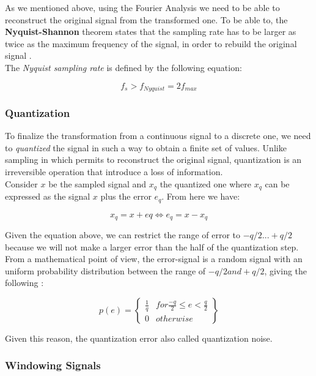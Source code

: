 \noindent As we mentioned above, using the Fourier Analysis we need to be able to reconstruct the original signal from the transformed one. To be able to, the \textbf{Nyquist-Shannon} theorem states that the sampling rate has to be larger as twice as the maximum frequency of the signal, in order to rebuild the original signal \cite{sampling_illinois}.\\
\noindent The \textit{Nyquist sampling rate} is defined by the following equation:

\begin{equation}
f_{s} > f_{Nyquist} = 2f_{max}
\end{equation}


\subsubsection{Quantization}
\label{subs:quantization}
To finalize the transformation from a continuous signal to a discrete one, we need to \textit{quantized} the signal in such a way to obtain a finite set of values. Unlike sampling in which permits to reconstruct the original signal, quantization is an irreversible operation that introduce a loss of information. \\
\noindent Consider $x$ be the sampled signal and $x_{q}$ the quantized one where $x_{q}$ can be expressed as the signal $x$ plus the error $e_{q}$. From here we have:

\begin{equation}
x_{q} = x + e{q} \Leftrightarrow e_{q} = x - x_{q}
\end{equation}

Given the equation above, we can restrict the range of error to $-q/2 ... +q/2$ because we will not make a larger error than the half of the quantization step. From a mathematical point of view, the error-signal is a random signal with an uniform probability distribution between the range of $−q/2 and +q/2$, giving the following \cite{quantization_math
	}:

\begin{equation}
p(e) = \begin{Bmatrix}
			\frac{1}{q} & for \frac{-q}{2} \leq  e < \frac{q}{2}\\ 
			0 			& otherwise
		\end{Bmatrix}
\end{equation}

Given this reason, the quantization error also called quantization noise.

\subsubsection{Windowing Signals}
\label{ssubs:windowing_signals}


